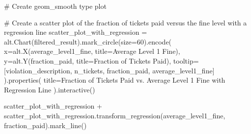 \documentclass[
  letterpaper,
  DIV=11,
  numbers=noendperiod]{scrartcl}
\newenvironment{Shaded}{\begin{snugshade}}{\end{snugshade}}
\newcommand{\CommentTok}[1]{\textcolor[rgb]{0.37,0.37,0.37}{#1}}
\newcommand{\DecValTok}[1]{\textcolor[rgb]{0.68,0.00,0.00}{#1}}
\newcommand{\NormalTok}[1]{\textcolor[rgb]{0.00,0.23,0.31}{#1}}
\newcommand{\OperatorTok}[1]{\textcolor[rgb]{0.37,0.37,0.37}{#1}}
\newcommand{\StringTok}[1]{\textcolor[rgb]{0.13,0.47,0.30}{#1}}
\begin{document}
\begin{Shaded}
\begin{Highlighting}[]
\CommentTok{\# Create geom\_smooth type plot}

\CommentTok{\# Create a scatter plot of the fraction of tickets paid versus the fine level with a regression line}
\NormalTok{scatter\_plot\_with\_regression }\OperatorTok{=}\NormalTok{ alt.Chart(filtered\_result).mark\_circle(size}\OperatorTok{=}\DecValTok{60}\NormalTok{).encode(}
\NormalTok{    x}\OperatorTok{=}\NormalTok{alt.X(}\StringTok{\textquotesingle{}average\_level1\_fine\textquotesingle{}}\NormalTok{, title}\OperatorTok{=}\StringTok{\textquotesingle{}Average Level 1 Fine\textquotesingle{}}\NormalTok{),}
\NormalTok{    y}\OperatorTok{=}\NormalTok{alt.Y(}\StringTok{\textquotesingle{}fraction\_paid\textquotesingle{}}\NormalTok{, title}\OperatorTok{=}\StringTok{\textquotesingle{}Fraction of Tickets Paid\textquotesingle{}}\NormalTok{),}
\NormalTok{    tooltip}\OperatorTok{=}\NormalTok{[}\StringTok{\textquotesingle{}violation\_description\textquotesingle{}}\NormalTok{, }\StringTok{\textquotesingle{}n\_tickets\textquotesingle{}}\NormalTok{, }\StringTok{\textquotesingle{}fraction\_paid\textquotesingle{}}\NormalTok{, }\StringTok{\textquotesingle{}average\_level1\_fine\textquotesingle{}}\NormalTok{]}
\NormalTok{).properties(}
\NormalTok{    title}\OperatorTok{=}\StringTok{\textquotesingle{}Fraction of Tickets Paid vs. Average Level 1 Fine with Regression Line\textquotesingle{}}
\NormalTok{).interactive()}

\NormalTok{scatter\_plot\_with\_regression }\OperatorTok{+}\NormalTok{ scatter\_plot\_with\_regression.transform\_regression(}\StringTok{\textquotesingle{}average\_level1\_fine\textquotesingle{}}\NormalTok{, }\StringTok{\textquotesingle{}fraction\_paid\textquotesingle{}}\NormalTok{).mark\_line()}
\end{Highlighting}
\end{Shaded}
\end{document}
